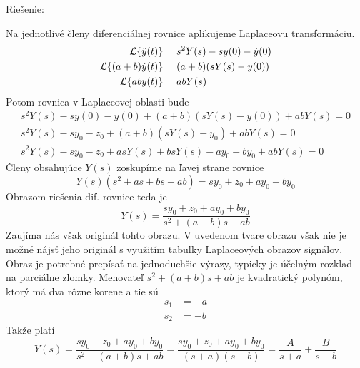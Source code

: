 \documentclass[a4paper, 10pt, ]{article}
\begin{document}
\begin{itemize}[leftmargin=0pt, labelsep=3mm, itemsep=0pt]
{    Riešenie:}

    Na jednotlivé členy diferenciálnej rovnice aplikujeme Laplaceovu transformáciu. 
    \begin{subequations}
        \begin{align}
            \mathcal{L}{\left\{\ddot y(t)\right\}} &= s^2 Y(s) - s y(0) - \dot y(0) \\
            \mathcal{L}{\left\{(a+b) \dot y(t)\right\}} &= (a+b) (s Y(s) - y(0)) \\
            \mathcal{L}{\left\{a b y(t)\right\}} &= a b Y(s)
        \end{align}
    \end{subequations}
    Potom rovnica v Laplaceovej oblasti bude
    \begin{subequations}
        \begin{align}
            s^2 Y(s) - s y(0) - \dot y(0) + (a+b) (s Y(s) - y(0)) + a b Y(s) = 0 \\
            s^2 Y(s) - s y_0 - z_0 + (a+b) (s Y(s) - y_0) + a b Y(s) = 0 \\
            s^2 Y(s) - s y_0 - z_0 + a s Y(s) + b s Y(s) - a y_0 - b y_0 + a b Y(s) = 0 
        \end{align}
    \end{subequations}
    Členy obsahujúce $Y(s)$ zoskupíme na ľavej strane rovnice
    \begin{equation}
        Y(s) (s^2 + a s + b s + a b) = s y_0 + z_0 + a y_0 + b y_0
    \end{equation}
    Obrazom riešenia dif. rovnice teda je
    \begin{equation}
        Y(s) = \frac{s y_0 + z_0 + a y_0 + b y_0}{s^2 + (a+b) s + a b}
    \end{equation}
    Zaujíma nás však originál tohto obrazu. V uvedenom tvare obrazu však nie je možné nájsť jeho originál s využitím tabuľky Laplaceových obrazov signálov. Obraz je potrebné prepísať na jednoduchšie výrazy, typicky je účelným rozklad na parciálne zlomky.
    Menovateľ $s^2 + (a+b) s + a b$ je  kvadratický polynóm, ktorý má dva rôzne korene a tie sú
    \begin{subequations}
        \begin{align}
            s_1 &= -a \\
            s_2 &= -b
        \end{align}
    \end{subequations}
    Takže platí
    \begin{equation}
        Y(s) = \frac{s y_0 + z_0 + a y_0 + b y_0}{s^2 + (a+b) s + a b} = \frac{s y_0 + z_0 + a y_0 + b y_0}{(s+a)(s+b)} =\frac{A}{s + a} + \frac{B}{s + b}

\end{equation}
\end{itemize}
\end{document}
